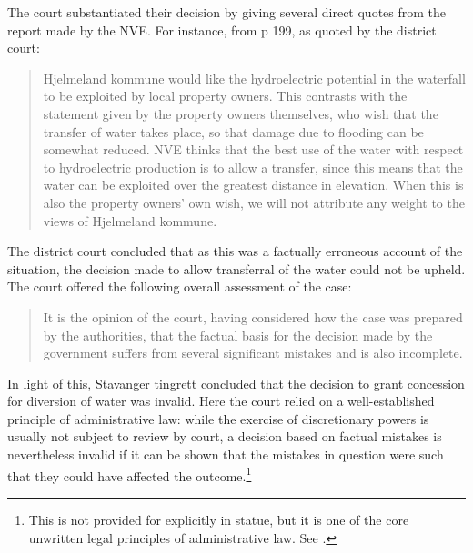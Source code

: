 The court substantiated their decision by giving several direct quotes from the report made by the NVE. For instance, from p 199, as quoted by the district court:
\begin{quote}
Hjelmeland kommune would like the hydroelectric potential in the waterfall to be exploited by 
local property owners. This contrasts with the statement given by the property owners 
themselves, who wish that the transfer of water takes place, so that damage due to flooding can be 
somewhat reduced. NVE thinks that the best use of the water with respect to hydroelectric 
production is to allow a transfer, since this means that the water can be exploited over the greatest
distance in elevation. When this is also the property owners' own wish, we will not attribute any 
weight to the views of Hjelmeland kommune.
\end{quote}

The district court concluded that as this was a factually erroneous account of the situation, the decision made to allow transferral of the water could not be upheld. The court offered the following overall assessment of the case:

\begin{quote}
It is the opinion of the court, having considered how the case was prepared by the authorities, that the factual basis for the decision made by the government suffers from several significant mistakes and is also incomplete.
\end{quote}

In light of this, Stavanger tingrett concluded that the decision to grant concession for diversion of water was invalid. Here the court relied on a well-established principle of administrative law: while the exercise of discretionary powers is usually not subject to review by court, a decision based on factual mistakes is nevertheless invalid if it can be shown that the mistakes in question were such that they could have affected the outcome.\footnote{This is not provided for explicitly in statue, but it is one of the core unwritten legal principles of administrative law. See \cite{eckhoff14}.}

